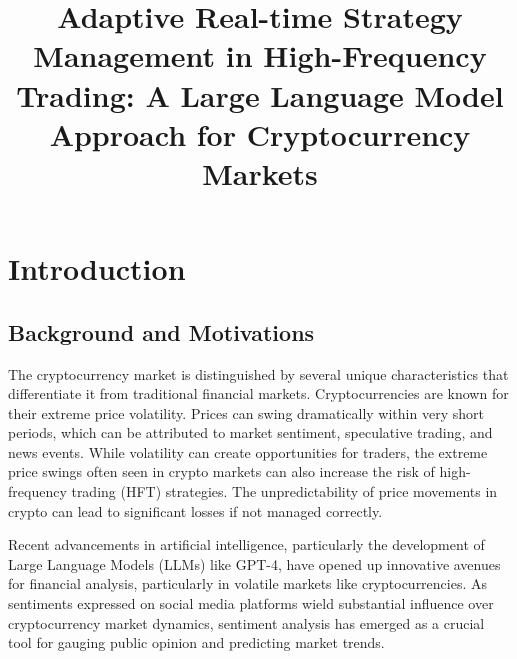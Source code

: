 \documentclass[conference]{IEEEtran}
\begin{document}
\title{Adaptive Real-time Strategy Management in High-Frequency Trading: A Large Language Model Approach for Cryptocurrency Markets\\
}

\author{
\and
{}
\and
{}

}

\maketitle

\section{Introduction}

\subsection{Background and Motivations}

The cryptocurrency market is distinguished by several unique characteristics that differentiate it from traditional financial markets. Cryptocurrencies are known for their extreme price volatility. Prices can swing dramatically within very short periods, which can be attributed to market sentiment, speculative trading, and news events.  While volatility can create opportunities for traders, the extreme price swings often seen in crypto markets can also increase the risk of high-frequency trading (HFT) strategies. The unpredictability of price movements in crypto can lead to significant losses if not managed correctly. 

Recent advancements in artificial intelligence, particularly the development of Large Language Models (LLMs) like GPT-4, have opened up innovative avenues for financial analysis, particularly in volatile markets like cryptocurrencies. As sentiments expressed on social media platforms wield substantial influence over cryptocurrency market dynamics, sentiment analysis has emerged as a crucial tool for gauging public opinion and predicting market trends.
\end{document}
